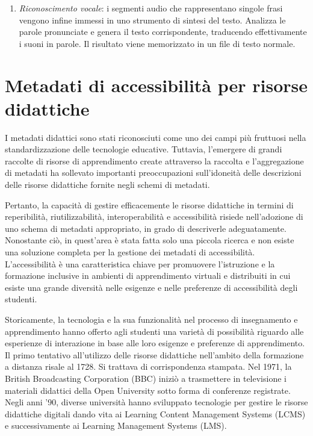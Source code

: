 \begin{enumerate}
\item \textit{Riconoscimento vocale}: i segmenti audio che rappresentano singole frasi vengono infine immessi in uno strumento di sintesi del testo. Analizza le parole pronunciate e genera il testo corrispondente, traducendo effettivamente i suoni in parole. Il risultato viene memorizzato in un file di testo normale.
\end{enumerate}

\section{Metadati di accessibilità per risorse didattiche}
I metadati didattici sono stati riconosciuti come uno dei campi più fruttuosi nella standardizzazione delle tecnologie educative. Tuttavia, l'emergere di grandi raccolte di risorse di apprendimento create attraverso la raccolta e l'aggregazione di metadati ha sollevato importanti preoccupazioni sull'idoneità delle descrizioni delle risorse didattiche fornite negli schemi di metadati.

Pertanto, la capacità di gestire efficacemente le risorse didattiche in termini di reperibilità, riutilizzabilità, interoperabilità e accessibilità risiede nell'adozione di uno schema di metadati appropriato, in grado di descriverle adeguatamente. Nonostante ciò, in quest'area è stata fatta solo una piccola ricerca e non esiste una soluzione completa per la gestione dei metadati di accessibilità. L'accessibilità è una caratteristica chiave per promuovere l'istruzione e la formazione inclusive in ambienti di apprendimento virtuali e distribuiti in cui esiste una grande diversità nelle esigenze e nelle preferenze di accessibilità degli studenti.

Storicamente, la tecnologia e la sua funzionalità nel processo di insegnamento e apprendimento hanno offerto agli studenti una varietà di possibilità riguardo alle esperienze di interazione in base alle loro esigenze e preferenze di apprendimento. Il primo tentativo all'utilizzo delle risorse didattiche nell'ambito della formazione a distanza risale al 1728. Si trattava di corrispondenza stampata. Nel 1971, la British Broadcasting Corporation (BBC) iniziò a trasmettere in televisione i materiali didattici della Open University sotto forma di conferenze registrate. Negli anni '90, diverse università hanno sviluppato tecnologie per gestire le risorse didattiche digitali dando vita ai Learning Content Management Systems (LCMS) e successivamente ai Learning Management Systems (LMS).

